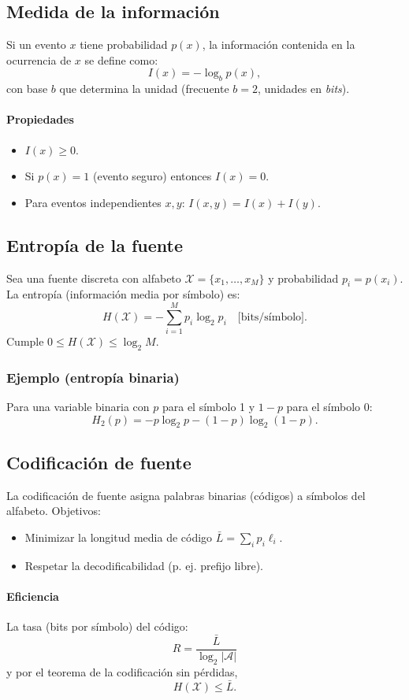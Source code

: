 \documentclass[11pt,a4paper]{article}
\begin{document}
\subsection{Medida de la información}
Si un evento $x$ tiene probabilidad $p(x)$, la información contenida en la ocurrencia de $x$ se define como:
\[
I(x) = -\log_b p(x),
\]
con base $b$ que determina la unidad (frecuente $b=2$, unidades en \emph{bits}).

\paragraph{Propiedades}
\begin{itemize}
  \item $I(x)\ge 0$.
  \item Si $p(x)=1$ (evento seguro) entonces $I(x)=0$.
  \item Para eventos independientes $x,y$: $I(x,y)=I(x)+I(y)$.
\end{itemize}

\subsection{Entropía de la fuente}
Sea una fuente discreta con alfabeto $\mathcal{X}=\{x_1,\dots,x_M\}$ y probabilidad $p_i=p(x_i)$. La entropía (información media por símbolo) es:
\[
H(\mathcal{X})=-\sum_{i=1}^{M} p_i \log_2 p_i \quad\text{[bits/símbolo]}.
\]
Cumple $0\le H(\mathcal{X}) \le \log_2 M$.

\subsubsection*{Ejemplo (entropía binaria)}
Para una variable binaria con $p$ para el símbolo 1 y $1-p$ para el símbolo 0:
\[
H_2(p) = -p\log_2 p -(1-p)\log_2(1-p).
\]

\subsection{Codificación de fuente}
La codificación de fuente asigna palabras binarias (códigos) a símbolos del alfabeto. Objetivos:
\begin{itemize}
  \item Minimizar la longitud media de código $\bar{L} = \sum_i p_i \ell_i$.
  \item Respetar la decodificabilidad (p. ej. prefijo libre).
\end{itemize}

\paragraph{Eficiencia}
La tasa (bits por símbolo) del código:
\[
R = \frac{\bar{L}}{\log_2 |\mathcal{A}|}
\]
y por el teorema de la codificación sin pérdidas,
\[
H(\mathcal{X}) \le \bar{L}.
\]
\end{document}

